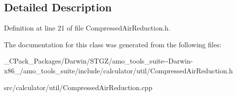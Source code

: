\subsection{Detailed Description}


Definition at line 21 of file Compressed\+Air\+Reduction.\+h.



The documentation for this class was generated from the following files\+:\begin{DoxyCompactItemize}
\item 
\+\_\+\+C\+Pack\+\_\+\+Packages/\+Darwin/\+S\+T\+G\+Z/amo\+\_\+tools\+\_\+suite-\/-\/\+Darwin-\/x86\+\_/amo\+\_\+tools\+\_\+suite/include/calculator/util/Compressed\+Air\+Reduction.\+h\item 
src/calculator/util/Compressed\+Air\+Reduction.\+cpp\end{DoxyCompactItemize}
